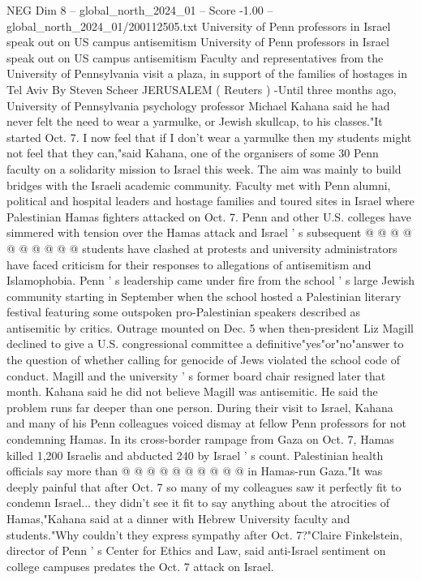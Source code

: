 \begin{textsample}{NEG Dim 8 – global\_north\_2024\_01 – Score -1.00 – global\_north\_2024\_01/200112505.txt}  \label{ex:f8_neg_213}
University of Penn professors in Israel speak out on US campus antisemitism University of Penn professors in Israel speak out on US campus antisemitism Faculty and representatives from the University of Pennsylvania visit a plaza, in support of the families of hostages in Tel Aviv By Steven Scheer JERUSALEM ( Reuters ) -Until three months ago, University of Pennsylvania psychology professor Michael Kahana said he had never felt the need to wear a yarmulke, or Jewish skullcap, to his classes."It started Oct. 7.
I now feel that if I don't wear a yarmulke then my students might not feel that they can,"said Kahana, one of the organisers of some 30 Penn faculty on a solidarity mission to Israel this week.
The aim was mainly to build bridges with the Israeli academic community.
Faculty met with Penn alumni, political and hospital leaders and hostage families and toured sites in Israel where Palestinian Hamas fighters attacked on Oct. 7.
Penn and other U.S. colleges have simmered with tension over the Hamas attack and Israel ' s subsequent @ @ @ @ @ @ @ @ @ @ students have clashed at protests and university administrators have faced criticism for their responses to allegations of antisemitism and Islamophobia.
Penn ' s leadership came under fire from the school ' s large Jewish community starting in September when the school hosted a Palestinian literary festival featuring some outspoken pro-Palestinian speakers described as antisemitic by critics.
Outrage mounted on Dec. 5 when then-president Liz Magill declined to give a U.S. congressional committee a definitive"yes"or"no"answer to the question of whether calling for genocide of Jews violated the school code of conduct.
Magill and the university ' s former board chair resigned later that month.
Kahana said he did not believe Magill was antisemitic.
He said the problem runs far deeper than one person.
During their visit to Israel, Kahana and many of his Penn colleagues voiced dismay at fellow Penn professors for not condemning Hamas.
In its cross-border rampage from Gaza on Oct. 7, Hamas killed 1,200 Israelis and abducted 240 by Israel ' s count.
Palestinian health officials say more than @ @ @ @ @ @ @ @ @ @ in Hamas-run Gaza."It was deeply painful that after Oct. 7 so many of my colleagues saw it perfectly fit to condemn Israel... they didn't see it fit to say anything about the atrocities of Hamas,"Kahana said at a dinner with Hebrew University faculty and students."Why couldn't they express sympathy after Oct. 7?"Claire Finkelstein, director of Penn ' s Center for Ethics and Law, said anti-Israel sentiment on college campuses predates the Oct. 7 attack on Israel.

\end{textsample}
